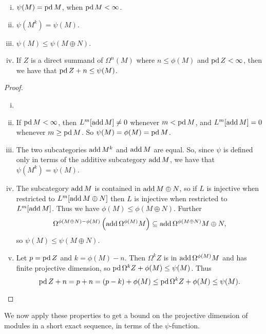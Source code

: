\begin{lemma} \cite[Lemma~3]{IgTo05} \label{lem:properties_of_psi}
	\begin{enumerate}[i)]
		\item $\psi(M) = \operatorname{pd} M$, when $\operatorname{pd} M < \infty$.
		\item $\psi(M^k) = \psi(M)$.
		\item $\psi(M) \leq \psi(M\oplus N)$.
		\item If $Z$ is a direct summand of $\Omega^n(M)$ where $n \leq \phi(M)$ and $\operatorname{pd} Z < \infty$, then we have that $\operatorname{pd} Z + n \leq \psi(M)$.
	\end{enumerate}
	\begin{proof}
		\begin{enumerate}[i)]
			\item[] %
			\item If $\operatorname{pd} M < \infty$, then $L^m[\operatorname{add} M] \neq 0$ whenever $m < \operatorname{pd} M$, and $L^m[\operatorname{add} M] =0$ whenever $m \geq \operatorname{pd} M$. So $\psi(M)=\phi(M)=\operatorname{pd} M$.
			\item The two subcategories $\operatorname{add} M^k$ and $\operatorname{add} M$ are equal. So, since $\psi$ is defined only in terms of the additive subcategory $\operatorname{add} M$, we have that $\psi(M^k)=\psi(M)$.
			\item  The subcategory $\operatorname{add} M$ is contained in $\operatorname{add} M\oplus N$, so if $L$ is injective when restricted to $L^m[\operatorname{add} M\oplus N]$ then $L$ is injective when restricted to $L^m[\operatorname{add} M]$. Thus we have $\phi(M) \leq \phi({M\oplus N})$. Further $$\Omega^{\phi({M\oplus N})-\phi(M)}\left(\operatorname{add}\Omega^{\phi(M)}M \right) \subseteq \operatorname{add}\Omega^{\phi({M\oplus N})} M\oplus N,$$ 
			so $\psi(M) \leq \psi(M\oplus N)$.
			\item Let $p=\operatorname{pd} Z$ and $k = \phi(M) - n$. Then $\Omega^k Z$ is in $\operatorname{add} \Omega^{\phi(M)}M$ and has finite projective dimension, so $\operatorname{pd}\Omega^k Z + \phi(M) \leq \psi(M)$. Thus $$\operatorname{pd} Z + n = p + n = (p-k) + \phi(M) \leq \operatorname{pd}\Omega^k Z + \phi(M) \leq \psi(M).$$
		\end{enumerate}
	\end{proof}
\end{lemma}

We now apply these properties to get a bound on the projective dimension of modules in a short exact sequence, in terms of the $\psi$-function.

